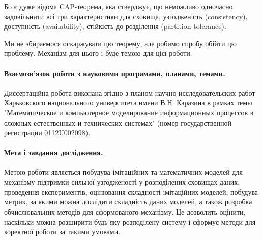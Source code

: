 \documentclass[14pt]{vakthesis}
\begin{document}
Бо є дуже відома CAP-теорема, яка стверджує, що неможливо одночасно задовільнити всі три 
характеристики для сховища, узгодженість (consistency), доступність (availability), 
стійкість до розділення (partition tolerance).

Ми не збираємося оскаржувати цю теорему, але робимо спробу обійти цю проблему. Механізм для цього і буде темою для цієї роботи.

\paragraph{\bfseries Взаємозв'язок роботи з науковими програмами, планами, темами.}
Диссертаційна робота виконана згідно з планом \linebreak
научно-исследовательских работ Харьковского национального университета имени В.Н. Каразина 
в рамках темы "Математическое и компьютерное моделирование информационных процессов в сложных естественных и технических системах" 
(номер государственной регистрации 0112U002098).


\paragraph{\bfseries Мета і завдання дослідження.}
Метою роботи являється побудува імітаційних та математичних моделей для механізму
підтримки сильної узгодженості у розподілених сховищах даних, проведення експериментів, оцінювання складності імітаційних моделей, побудува метрик, за якими можна дослідити складність даних моделей, а також розробка
обчислювальних методів для сформованого механізму. Це дозволить оцінити, наскільки можна розширити будь-яку розподілену систему і сформує методи для коректної роботи за такими умовами.
\end{document}
